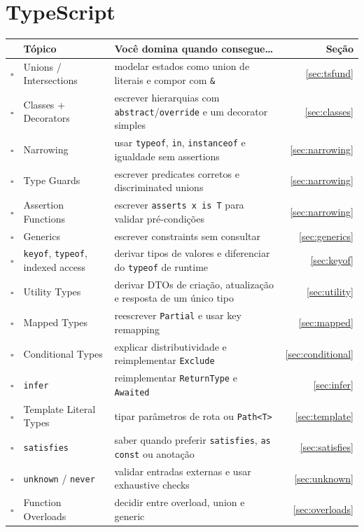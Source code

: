\documentclass[12pt,a4paper,oneside]{book}
\newcommand{\code}[1]{\texttt{#1}}
\newcommand{\cb}{$\square$}
\begin{document}
\section{TypeScript}

{\small
\begin{tabularx}{\textwidth}{@{}clXr@{}}
\toprule
 & \textbf{Tópico} & \textbf{Você domina quando consegue\ldots} & \textbf{Seção} \\
\midrule
\cb & Unions / Intersections & modelar estados como union de literais e compor com \code{\&} & \ref{sec:tsfund} \\
\cb & Classes + Decorators & escrever hierarquias com \code{abstract}/\code{override} e um decorator simples & \ref{sec:classes} \\
\cb & Narrowing & usar \code{typeof}, \code{in}, \code{instanceof} e igualdade sem assertions & \ref{sec:narrowing} \\
\cb & Type Guards & escrever predicates corretos e discriminated unions & \ref{sec:narrowing} \\
\cb & Assertion Functions & escrever \code{asserts x is T} para validar pré-condições & \ref{sec:narrowing} \\
\cb & Generics & escrever constraints sem consultar & \ref{sec:generics} \\
\cb & \code{keyof}, \code{typeof}, indexed access & derivar tipos de valores e diferenciar do \code{typeof} de runtime & \ref{sec:keyof} \\
\cb & Utility Types & derivar DTOs de criação, atualização e resposta de um único tipo & \ref{sec:utility} \\
\cb & Mapped Types & reescrever \code{Partial} e usar key remapping & \ref{sec:mapped} \\
\cb & Conditional Types & explicar distributividade e reimplementar \code{Exclude} & \ref{sec:conditional} \\
\cb & \code{infer} & reimplementar \code{ReturnType} e \code{Awaited} & \ref{sec:infer} \\
\cb & Template Literal Types & tipar parâmetros de rota ou \code{Path<T>} & \ref{sec:template} \\
\cb & \code{satisfies} & saber quando preferir \code{satisfies}, \code{as const} ou anotação & \ref{sec:satisfies} \\
\cb & \code{unknown} / \code{never} & validar entradas externas e usar exhaustive checks & \ref{sec:unknown} \\
\cb & Function Overloads & decidir entre overload, union e generic & \ref{sec:overloads} \\

\end{tabularx}}
\end{document}
